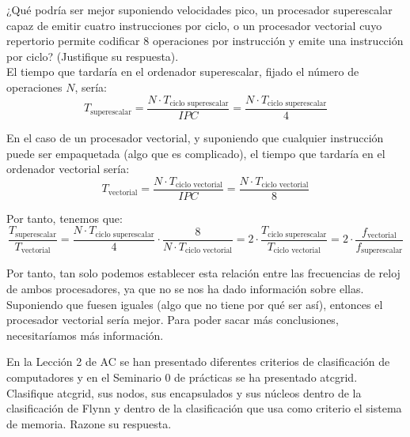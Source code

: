 \begin{cuestion}
    ¿Qué podría ser mejor suponiendo velocidades pico, un procesador superescalar capaz de emitir
    cuatro instrucciones por ciclo, o un procesador vectorial cuyo repertorio permite codificar 8 operaciones
    por instrucción y emite una instrucción por ciclo? (Justifique su respuesta).\\

    El tiempo que tardaría en el ordenador superescalar, fijado el número de operaciones $N$, sería:
    \begin{equation*}
        T_{\text{superescalar}} = \frac{N\cdot T_{\text{ciclo superescalar}}}{IPC} = \frac{N\cdot T_{\text{ciclo superescalar}}}{4}
    \end{equation*}

    En el caso de un procesador vectorial, y suponiendo que cualquier instrucción puede ser empaquetada (algo que es complicado),
    el tiempo que tardaría en el ordenador vectorial sería:
    \begin{equation*}
        T_{\text{vectorial}} = \frac{N\cdot T_{\text{ciclo vectorial}}}{IPC} = \frac{N\cdot T_{\text{ciclo vectorial}}}{8}
    \end{equation*}

    Por tanto, tenemos que:
    \begin{equation*}
        \frac{T_{\text{superescalar}}}{T_{\text{vectorial}}} = \frac{N\cdot T_{\text{ciclo superescalar}}}{4} \cdot \frac{8}{N\cdot T_{\text{ciclo vectorial}}} = 2\cdot \frac{T_{\text{ciclo superescalar}}}{T_{\text{ciclo vectorial}}}
        = 2\cdot \frac{f_{\text{vectorial}}}{f_{\text{superescalar}}}
    \end{equation*}

    Por tanto, tan solo podemos establecer esta relación entre las frecuencias de reloj de ambos procesadores, ya que no se nos ha dado información sobre ellas.
    Suponiendo que fuesen iguales (algo que no tiene por qué ser así), entonces el procesador vectorial sería mejor.
    Para poder sacar más conclusiones, necesitaríamos más información.
\end{cuestion}

\begin{cuestion}
    En la Lección 2 de AC se han presentado diferentes criterios de clasificación de computadores y en
    el Seminario 0 de prácticas se ha presentado atcgrid. Clasifique atcgrid, sus nodos, sus encapsulados y
    sus núcleos dentro de la clasificación de Flynn y dentro de la clasificación que usa como criterio el
    sistema de memoria. Razone su respuesta.
\end{cuestion}

